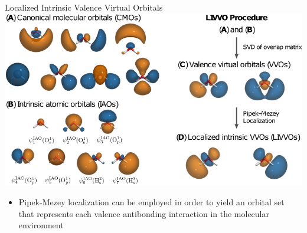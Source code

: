 \documentclass[t]{beamer}
\begin{document}
\begin{frame}{Localized Intrinsic Valence Virtual Orbitals}
\centering
\includegraphics[width=0.75\linewidth]{livvo_procedure_4.png}
\begin{itemize}
\item Pipek-Mezey localization can be employed in order to yield an orbital set that represents each valence antibonding interaction in the molecular environment
\end{itemize}
\end{frame}
\end{document}

